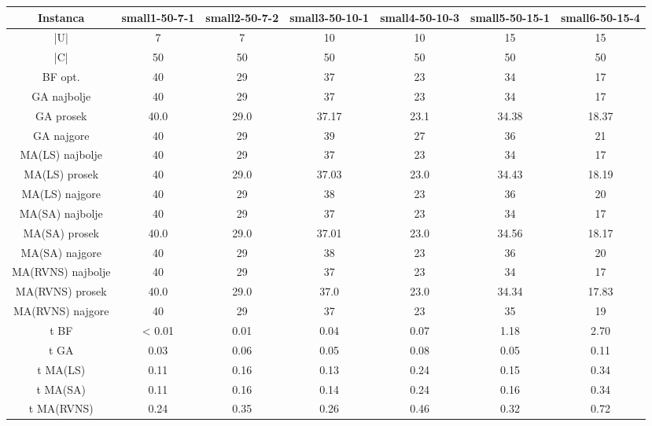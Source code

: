 \documentclass[12pt, a4paper]{article}
\theoremstyle{definition}
\begin{document}
\begin{table}
\begin{adjustbox}{width=\columnwidth,center}
\begin{tabular}{ |c|c|c|c|c|c|c| }
\hline
Instanca & small1-50-7-1 & small2-50-7-2 & small3-50-10-1 & small4-50-10-3 & small5-50-15-1 & small6-50-15-4 \\
\hline
|U| & 7 & 7 & 10 & 10 & 15 & 15 \\
\hline
|C| & 50 & 50 & 50 & 50 & 50 & 50 \\
\hline
BF opt. & 40 & 29 & 37 & 23 & 34 & 17 \\
\hline
GA najbolje & 40 & 29 & 37 & 23 & 34 & 17 \\
\hline
GA prosek & 40.0 & 29.0 & 37.17 & 23.1 & 34.38 & 18.37 \\
\hline
GA najgore & 40 & 29 & 39 & 27 & 36 & 21 \\
\hline
MA(LS) najbolje & 40 & 29 & 37 & 23 & 34 & 17 \\
\hline
MA(LS) prosek & 40 & 29.0 & 37.03 & 23.0 & 34.43 & 18.19 \\
\hline
MA(LS) najgore & 40 & 29 & 38 & 23 & 36 & 20 \\
\hline
MA(SA) najbolje & 40 & 29 & 37 & 23 & 34 & 17 \\
\hline
MA(SA) prosek & 40.0 & 29.0 & 37.01 & 23.0 & 34.56 & 18.17 \\
\hline
MA(SA) najgore & 40 & 29 & 38 & 23 & 36 & 20 \\
\hline
MA(RVNS) najbolje & 40 & 29 & 37 & 23 & 34 & 17 \\
\hline
MA(RVNS) prosek & 40.0 & 29.0 & 37.0 & 23.0 & 34.34 & 17.83 \\
\hline
MA(RVNS) najgore & 40 & 29 & 37 & 23 & 35 & 19 \\
\hline
t BF & < 0.01 & 0.01 & 0.04 & 0.07 & 1.18 & 2.70 \\
\hline
t GA & 0.03 & 0.06 & 0.05 & 0.08 & 0.05 & 0.11 \\
\hline
t MA(LS) & 0.11 & 0.16 & 0.13 & 0.24 & 0.15 & 0.34 \\
\hline
t MA(SA) & 0.11 & 0.16 & 0.14 & 0.24 & 0.16 & 0.34 \\
\hline
t MA(RVNS) & 0.24 & 0.35 & 0.26 & 0.46 & 0.32 & 0.72 \\
\hline
\end{tabular}
\end{adjustbox}
\end{table}
\end{document}
